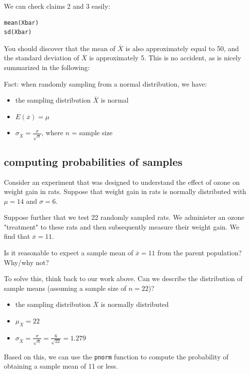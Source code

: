 \documentclass[11pt]{article}
\begin{document}
We can check claims 2 and 3 easily:

\begin{verbatim}
mean(Xbar)
sd(Xbar)
\end{verbatim}

You should discover that the mean of $\overline{X}$ is also approximately equal to 50, and the standard deviation of $\overline{X}$ is approximately 5.  This is no accident, as is nicely summarized in the following:

Fact: when randomly sampling from a normal distribution, we have:
\begin{itemize}
\item the sampling distribution $\overline{X}$ is normal
\item $E(\overline{x})=\mu$
\item $\sigma_{\overline{X}} = \frac{\sigma}{\sqrt{n}}$, where $n$ = sample size
\end{itemize}

\subsection*{computing probabilities of samples}
\label{sec-1-2}

Consider an experiment that was designed to understand the effect of ozone on weight gain in rats. Suppose that weight gain in rats is normally distributed with $\mu=14$ and $\sigma=6$.

Suppose further that we test 22 randomly sampled rats.  We administer an ozone "treatment" to these rats and then subsequently measure their weight gain.  We find that $\overline{x}=11$.

Is it reasonable to expect a sample mean of $\overline{x}=11$ from the parent population?  Why/why not?

To solve this, think back to our work above.  Can we describe the distribution of sample means (assuming a sample size of $n=22$)?

\begin{itemize}
\item the sampling distribution $\overline{X}$ is normally distributed
\item $\mu_{\overline{X}}=22$
\item $\sigma_{\overline{X}} = \frac{\sigma}{\sqrt{n}} = \frac{6}{\sqrt{22}} = 1.279$
\end{itemize}

Based on this, we can use the \texttt{pnorm} function to compute the probability of obtaining a sample mean of 11 or less.
\end{document}
